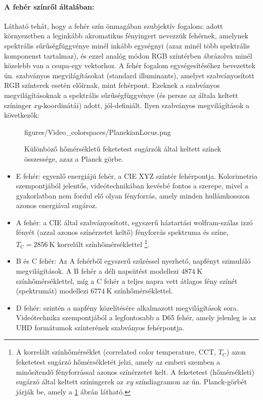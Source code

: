 \paragraph{A fehér színről általában:\\}
Látható tehát, hogy a fehér szín önmagában szubjektív fogalom: adott környezetben a leginkább akromatikus fényingert nevezzük fehérnek, amelynek spektrális sűrűségfüggvénye minél inkább egységnyi (azaz minél több spektrális komponenst tartalmaz), és ezzel analóg módon RGB színtérben ábrázolva minél közelebb van a csupa-egy vektorhoz.
A fehér fogalom egységesítéséhez bevezettek ún. szabványos megvilágításokat (standard illuminants), amelyet szabványosított RGB  színterek esetén előírnak, mint fehérpont.
Ezeknek a szabványos megvilágításoknak a spektrális sűrűségfüggvénye (és persze az általa keltett színinger $xy$-koordinátái) adott, jól-definiált.
Ilyen szabványos megvilágítások a következők:
\begin{figure}[]
	\centering
	\begin{minipage}[c]{0.6\textwidth}
	\begin{overpic}[width = 0.9\columnwidth ]{figures/Video_colorspaces/PlanckianLocus.png}
	\end{overpic} \end{minipage}\hfill
	\begin{minipage}[c]{0.4\textwidth}
	\caption{Különböző hőmérsékletű feketetest sugárzók által keltett színek összessége, azaz a Planck görbe.}
	\label{Fig:planck}  \end{minipage}
\end{figure}
\begin{itemize}
\item E fehér: egyenlő energiájú fehér, a CIE XYZ színtér fehérpontja. Kolorimetria szempontjából jelentős, videótechnikában kevésbé fontos a szerepe, mivel a gyakorlatban nem fordul elő olyan fényforrás, amely minden hullámhosszon azonos energiával sugároz.
\item A fehér: a CIE által szabványosított, egyszerű háztartási wolfram-szálas izzó fényét (azzal azonos színérzetet keltő) fényforrás spektruma és színe, $T_{\mathrm{C}} = 2856~\mathrm{K}$ korrelált színhőmérséklettel \footnote{A korrelált színhőmérséklet (correlated color temperature, CCT, $T_{\mathrm{C}}$) azon feketetest sugárzó hőmérsékletét jelzi, amely az emberi szemben a minősítendő fényforrással azonos színérzetet kelt.
A feketetest (hőmérsékleti) sugárzó által keltett színingerek az $xy$ színdiagramon az ún. Planck-görbét járják be, amely a \ref{Fig:planck} ábrán látható.}.
\item B és C fehér: Az A fehérből egyszerű szűréssel nyerhető, napfényt szimuláló megvilágítások.
A B fehér a déli napsütést modellezi $4874~\mathrm{K}$ színhőmérséklettel, míg a C fehér a teljes napra vett átlagos fény színét (spektrumát) modellezi $6774~\mathrm{K}$ színhőmérséklettel.
\item D fehér: szintén a napfény közelítésére alkalmazott megvilágítások sora.
Videótechnika szempontjából a legfontosabb a D65 fehér, amely jelenleg is az UHD formátumok színterének szabványos fehérpontja.
\end{itemize}

